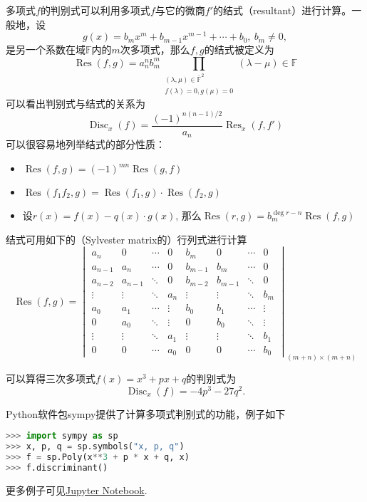 多项式$f$的判别式可以利用多项式$f$与它的微商$f'$的结式（resultant）进行计算。一般地，设
$$
g(x) = b_{m}x^{m} + b_{m-1}x^{m-1} + \cdots + b_{0}, ~ b_m \neq 0,
$$
是另一个系数在域$\mathbb{F}$内的$m$次多项式，那么$f, g$的结式被定义为
$$
\operatorname{Res} (f, g) = a_n^n b_m^m \prod_{ \substack{(\lambda, \mu) \in \bar{\mathbb{F}}^2 \\ f(\lambda) = 0, g(\mu) = 0}} (\lambda - \mu) \in \mathbb{F}
$$
可以看出判别式与结式的关系为
$$
\operatorname{Disc}_{x}(f) = \frac{(-1)^{n(n-1)/2}}{a_{n}} \operatorname{Res}_{x}(f, f')
$$
可以很容易地列举结式的部分性质：
\begin{itemize}
\item $\operatorname{Res} (f, g) = (-1)^{mn} \operatorname{Res} (g, f)$
\item $\operatorname{Res} (f_1f_2, g) = \operatorname{Res} (f_1, g) \cdot \operatorname{Res} (f_2, g)$
\item 设$r(x) = f(x) - q(x) \cdot g(x)$, 那么$\operatorname{Res} (r, g) = b_m^{\deg r - n}\operatorname{Res} (f, g)$
\end{itemize}
结式可用如下的（Sylvester matrix的）行列式进行计算
$$
\operatorname{Res} (f, g) = \begin{vmatrix} a_{n} & 0 & \cdots & 0 & b_{m} & 0 & \cdots & 0 \\ a_{n-1} & a_{n} & \cdots & 0 & b_{m-1} & b_{m} & \cdots & 0 \\ a_{n-2} & a_{n-1} & \ddots & 0 & b_{m-2} & b_{m-1} & \ddots & 0 \\ \vdots & \vdots & \ddots & a_{n} & \vdots & \vdots & \ddots & b_{m} \\ a_{0} & a_{1} & \cdots & \vdots & b_{0} & b_{1} & \cdots & \vdots \\ 0 & a_{0} & \ddots & \vdots & 0 & b_{0} & \ddots & \vdots \\ \vdots & \vdots & \ddots & a_{1} & \vdots & \vdots & \ddots & b_{1} \\ 0 & 0 & \cdots & a_{0} & 0 & 0 & \cdots & b_{0}\end{vmatrix}_{(m+n) \times (m+n)}
$$

可以算得三次多项式$f(x) = x^3 + px + q$的判别式为
$$\operatorname{Disc}_x(f) = -4p^3 - 27q^2.$$

Python软件包sympy提供了计算多项式判别式的功能，例子如下
\begin{center}
\begin{lstlisting}[language=Python]
>>> import sympy as sp
>>> x, p, q = sp.symbols("x, p, q")
>>> f = sp.Poly(x**3 + p * x + q, x)
>>> f.discriminant()
\end{lstlisting}
\end{center}
更多例子可见\href{https://gitee.com/wenh06/buaa-advanced-algebra-2021/blob/master/notebooks/class-7.ipynb}{Jupyter Notebook}.

